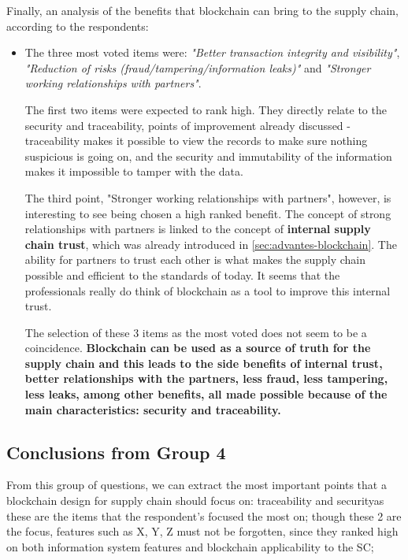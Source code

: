 Finally, an analysis of the benefits that blockchain can bring to the supply chain, according to the respondents:

\begin{itemize}
    \item The three most voted items were: \textit{"Better transaction integrity and visibility"}, \textit{"Reduction of risks (fraud/tampering/information leaks)"} and \textit{"Stronger working relationships with partners"}.

    The first two items were expected to rank high. They directly relate to the security and traceability, points of improvement already discussed - traceability makes it possible to view the records to make sure nothing suspicious is going on, and the security and immutability of the information makes it impossible to tamper with the data.
    
    The third point, "Stronger working relationships with partners", however, is interesting to see being chosen a high ranked benefit. The concept of strong relationships with partners is linked to  the concept of \textbf{internal supply chain trust}, which was already introduced in \ref{sec:advantes-blockchain}. The ability for partners to trust each other is what makes the supply chain possible and efficient to the standards of today. It seems that the professionals really do think of blockchain as a tool to improve this internal trust.
    
    The selection of these 3 items as the most voted does not seem to be a coincidence. \textbf{Blockchain can be used as a source of truth for the supply chain and this leads to the side benefits of internal trust, better relationships with the partners, less fraud, less tampering, less leaks, among other benefits, all made possible because of the main characteristics: security and traceability.}
\end{itemize}

\subsection*{Conclusions from Group 4}

From this group of questions, we can extract the most important points that a blockchain design for supply chain should focus on: traceability and securityas these are the items that the respondent's focused the most on; though these 2 are the focus, features such as X, Y, Z must not be forgotten, since they ranked high on both information system features and blockchain applicability to the SC; 

